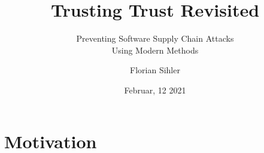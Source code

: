 



\title{Trusting Trust Revisited}
\subtitle{Preventing Software Supply Chain Attacks\hfill\\Using Modern Methods}

\author{Florian Sihler}

\date{Februar, 12 2021}



\section{Motivation}

\begin{frame}{\space}
    \pause{}\begin{layout-imageonly}
\end{layout-imageonly}
\end{frame}

\def\tblockfont#1{#1}
\tblocksize=0.95cm
\def\boostrapping{%
\begin{t-diagram}[tborder/.append style={draw=none,fill=lgray,rounded corners=4pt}]
    \begin{scope}[tborder/.append style={fill=btdl@color@secondary}]
        \onslide<2->{\tblock[g]{\tblocksize*8+4*\tblockoffset,2*\tblocksize+2*\tblockoffset}{\SL{}}{\ML{}}{\ML{}}}
    \end{scope}
    \begin{scope}[tborder/.append style={densely dashed}]
    \onslide<3->{\tblock[b]{2*\tblocksize+\tblockoffset,-\tblocksize-\tblockoffset}{T}{\ML{}}{\ML{}}}
        \onslide<5->{\tblock[c]{\tblocksize*4+\tblockoffset*2,0}{\SL0}{\ML{}}{\ML{}}}
        \onslide<7->{\tblock[f]{\tblocksize*6+3*\tblockoffset,\tblocksize+\tblockoffset}{\SL1}{\ML{}}{\ML{}}}
    \end{scope}
    \onslide<4->{\tblock[a]{0,0}{\SL0}{\ML{}}{T}}
    \onslide<6->{\tblock[d]{\tblocksize*2+\tblockoffset,\tblocksize+\tblockoffset}{\SL1}{\ML{}}{\SL0}}
    \onslide<8->{\tblock[e]{\tblocksize*4+2*\tblockoffset,2*\tblocksize+2*\tblockoffset}{\SL{}}{\ML{}}{\SL1}}
\end{t-diagram}
}

